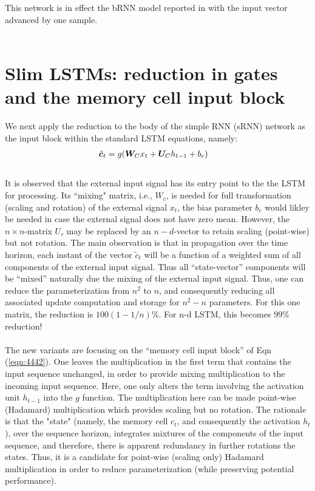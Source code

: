 \documentclass{article}
\begin{document}
{{{This network is in effect the bRNN model reported in \cite {salem2016basic} with the input vector advanced by one sample.
\\
\\

\section{Slim LSTMs: reduction in gates and the memory cell input block}

We next apply the reduction to the body of the simple RNN (sRNN) network as the input block within the standard LSTM equations, namely:
\begin{align}
	\label{eqn:4442}	\tilde{{\bm{c}}}_{t} &= g({\bm{W}}_{C} x_t + {\bm{U}}_{C} h_{t-1} + b_c)
\end{align}
\\
It is observed that the external input signal has its entry point to the the LSTM for processing. Its ``mixing" matrix, i.e., $W_c $, is needed for full transformation (scaling and rotation) of the external signal $x_t$, the bias parameter $b_c$ would likley be needed in case the external signal does not have zero mean. However, the $n \times n$-matrix $U_c$ may be replaced by an $n-d$-vector to retain scaling (point-wise) but not rotation. The main observation is that in propagation over the time horizon, each instant of the  vector $\tilde{c}_t$ will be a function of a weighted sum of all components of the external input signal. Thus all ``state-vector'' components will be ``mixed'' naturally due the mixing of the external input signal. Thus, one can reduce the parameterization from
$n^2$ to $n$, and consequently reducing all associated update computation and storage for $n^2-n$ parameters.  For this one matrix, the reduction is $100(1-1/n)\%$. For n-d LSTM, this becomes $99 \%$ reduction!
\\
\\
The new variants are focusing on the ``memory cell input block'' of Eqn (\ref{eqn:4442}).  One leaves the multiplication in the first term that contains the input sequence unchanged, in order to provide mixing multiplication to the incoming input sequence.  Here, one only alters the term involving the activation unit $h_{t-1}$ into the $g$ function. The multiplication here can be  made point-wise (Hadamard) multiplication which provides scaling but no rotation. The rationale is that the "state" (namely, the memory cell  $c_t$, and consequently the activation $h_t$), over the sequence horizon, integrates mixtures of the components of the input sequence, and therefore, there is apparent redundancy in further rotations the states. Thus, it is a candidate for point-wise (scaling only) Hadamard multiplication in order to reduce parameterization (while preserving potential performance). \\
}}}
\end{document}

